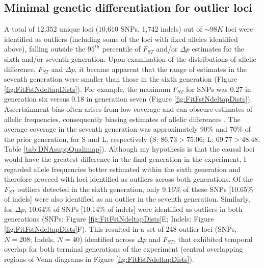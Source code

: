 \subsection{Minimal genetic differentiation for outlier loci}
A total of 12,352 unique loci (10,610 SNPs, 1,742 indels) out of $\sim98K$ loci were identified as outliers (including some of the loci with fixed alleles identified above), falling outside the $95^{th}$ percentile of $F_{ST}$ and/or $\Delta p$ estimates for the sixth and/or seventh generation. Upon examination of the distributions of allelic difference, $F_{ST}$ and $\Delta p$, it became apparent that the range of estimates in the seventh generation were smaller than those in the sixth generation (Figure \ref{fig:FitFstNdeltapDists}). For example, the maximum $F_{ST}$ for SNPs was 0.27 in generation six versus 0.18 in generation seven (Figure \ref{fig:FitFstNdeltapDists}). Ascertainment bias often arises from low coverage and can obscure estimates of allelic frequencies, consequently biasing estimates of allelic differences \citep{Schl15, Hahn18, Wals18c9}. The average coverage in the seventh generation was approximately 90\% and 70\% of the prior generation, for S and L, respectively (S: $86.73 > 75.06$; L: $69.77 > 48.48$, Table \ref{tab:DNAsuppQualimap}). Although my hypothesis is that the causal loci would have the greatest difference in the final generation in the experiment, I regarded allele frequencies better estimated within the sixth generation and therefore proceed with loci identified as outliers across both generations. Of the $F_{ST}$ outliers detected in the sixth generation, only 9.16\% of these SNPs [10.65\% of indels] were also identified as an outlier in the seventh generation. Similarly, for $\Delta p$, 10.64\% of SNPs [10.14\% of indels] were identified as outliers in both generations (SNPs: Figure \ref{fig:FitFstNdeltapDists}E; Indels: Figure \ref{fig:FitFstNdeltapDists}F). This resulted in a set of 248 outlier loci (SNPs, $N = 208$; Indels, $N = 40$) identified across $\Delta p$ and $F_{ST}$, that exhibited temporal overlap for both terminal generations of the experiment (central overlapping regions of Venn diagrams in Figure \ref{fig:FitFstNdeltapDists}).\par

